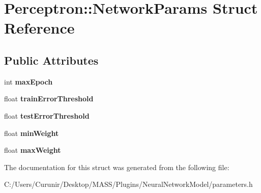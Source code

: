 \hypertarget{struct_perceptron_1_1_network_params}{}\section{Perceptron\+:\+:Network\+Params Struct Reference}
\label{struct_perceptron_1_1_network_params}
\subsection*{Public Attributes}
\begin{DoxyCompactItemize}
\item 
\mbox{\label{struct_perceptron_1_1_network_params_a955f8919dc3d743bcbd0bf9a3f6106a2}} 
int {\bfseries max\+Epoch}
\item 
\mbox{\label{struct_perceptron_1_1_network_params_acfaab07fcc5107fcea07e99696c0b311}} 
float {\bfseries train\+Error\+Threshold}
\item 
\mbox{\label{struct_perceptron_1_1_network_params_a15a189b1d36274a9e51681b9097e9ff8}} 
float {\bfseries test\+Error\+Threshold}
\item 
\mbox{\label{struct_perceptron_1_1_network_params_acf2c3e30c38ba223b045878bfbe246ac}} 
float {\bfseries min\+Weight}
\item 
\mbox{\label{struct_perceptron_1_1_network_params_ad508697bc7cda2e68075186ec1b81ca3}} 
float {\bfseries max\+Weight}
\end{DoxyCompactItemize}


The documentation for this struct was generated from the following file\+:\begin{DoxyCompactItemize}
\item 
C\+:/\+Users/\+Curunir/\+Desktop/\+M\+A\+S\+S/\+Plugins/\+Neural\+Network\+Model/parameters.\+h\end{DoxyCompactItemize}
